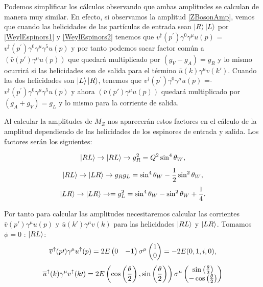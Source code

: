 \documentclass{article}
\theoremstyle{plain}
\theoremstyle{definition}
\newcommand{\sinthetahalf}{{\sin\left(\frac{\theta}{2}\right)}}
\begin{document}
	Podemos simplificar los cálculos observando que ambas amplitudes se calculan de manera muy similar. En efecto, si observamos la amplitud \eqref{ZBosonAmp}, vemos que cuando las helicidades de las partículas de entrada sean \(\ket{R}\ket{L}\) por \eqref{WeylEspinors1} y \eqref{WeylEspinors2} tenemos que \(v^\dagger(p^\prime)\gamma^0\gamma^\mu u(p)\) = \(v^\dagger(p^\prime)\gamma^0\gamma^\mu\gamma^5 u(p)\) y
	por tanto podemos sacar factor común a \((\bar{v}(p\prime)\gamma^\mu u(p))\) que quedará multiplicado por \((g_V-g_A) = g_R\) y lo mismo ocurrirá si las helicidades son de salida para el término \(\bar{u}(k)\gamma^\mu v(k\prime)\).
	Cuando las dos helicidades son \(\ket{L}\ket{R}\), tenemos que \(v^\dagger(p^\prime)\gamma^0\gamma^\mu u(p)\) =- \(v^\dagger(p^\prime)\gamma^0\gamma^\mu\gamma^5 u(p)\) y ahora \((\bar{v}(p\prime)\gamma^\mu u(p))\)  quedará multiplicado por \((g_A+g_V) = g_L\) y lo mismo para la corriente de salida.\par\noindent
	Al calcular la amplitudes de \(M_Z\)  nos aparecerán estos factores en el cálculo de la amplitud dependiendo de las helicidades de los espinores de entrada y salida. Los factores serán los siguientes:\newline
	\begin{longfbox}
	\[\ket{RL}\rightarrow\ket{RL}\rightarrow g_R^2 = Q^2\sin^4\theta_W, \] 
	\[\ket{RL}\rightarrow\ket{LR}\rightarrow g_Rg_L = \sin^4\theta_W -\frac{1}{2}\sin^2\theta_W,\] 
	\[\ket{LR}\rightarrow\ket{LR}\rightarrow = g_L^2 = \sin^4\theta_W -\sin^2\theta_W + \frac{1}{4}\text{.}\] 
\end{longfbox}
	Por tanto para calcular las amplitudes necesitaremos calcular las corrientes \(\bar{v}(p\prime)\gamma^\mu u(p)\) y \(\bar{u}(k\prime)\gamma^\mu v(k)\) para las helicidades \(\ket{RL}\) y \(\ket{LR} \). Tomamos \(\phi=0\) :\newline\newline\noindent
	\underline{\(\ket{RL}\)}:\newline\newline	
	\[\overline{v}^\uparrow(p\prime)\gamma^{\mu}u^\uparrow(p) = 2E\left(\begin{array}{@{}cc@{}}
	0&
	-1\\
	\end{array}\right)\sigma^{\mu}\left(\begin{array}{@{}c@{}}
	1\\
	0\\
	\end{array}\right) = -2E (0,1,i,0), \]
	\[\overline{u}^\uparrow(k)\gamma^{\mu}v^\uparrow(k\prime)=2E\left(\cos\left(\frac{\theta}{2}\right),\sinthetahalf \right)\sigma^\mu\left(\begin{array}{@{}c@{}}
	\sin\left(\frac{\theta}{2}\right)\\
	-\cos\left(\frac{\theta}{2}\right)\end{array}\right)
	\]
\end{document}
